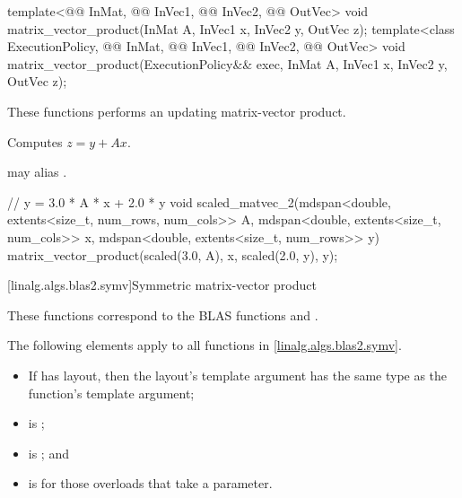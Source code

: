 %
\begin{itemdecl}
  template<@@ InMat, @@ InVec1, @@ InVec2, @@ OutVec>
    void matrix_vector_product(InMat A, InVec1 x, InVec2 y, OutVec z);
  template<class ExecutionPolicy,
           @@ InMat, @@ InVec1, @@ InVec2, @@ OutVec>
    void matrix_vector_product(ExecutionPolicy&& exec,
                               InMat A, InVec1 x, InVec2 y, OutVec z);
\end{itemdecl}

\begin{itemdescr}
\pnum
These functions performs an updating matrix-vector product.

\pnum
\effects
Computes $z = y + A x$.

\pnum
\remarks
{} may alias .
\end{itemdescr}

\begin{example}
\begin{codeblock}
// y = 3.0 * A * x + 2.0 * y
void scaled_matvec_2(mdspan<double, extents<size_t, num_rows, num_cols>> A,
  mdspan<double, extents<size_t, num_cols>> x, mdspan<double, extents<size_t, num_rows>> y) {
  matrix_vector_product(scaled(3.0, A), x, scaled(2.0, y), y);
}
\end{codeblock}
\end{example}

[linalg.algs.blas2.symv]{Symmetric matrix-vector product}

\pnum
\begin{note}
These functions correspond to the BLAS functions
 and \supercite{blas2}.
\end{note}

\pnum
The following elements apply to all functions in \ref{linalg.algs.blas2.symv}.

\pnum
\mandates
\begin{itemize}
\item
If  has  layout,
then the layout's  template argument has
the same type as the function's  template argument;
\item
{} is ;
\item
{}
is ; and
\item
{}
is  for those overloads that take a  parameter.
\end{itemize}

